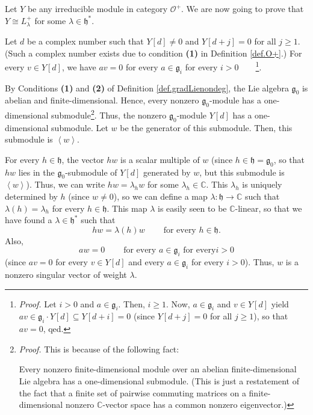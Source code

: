 \documentclass[etingof-lie.tex]{subfiles}
\begin{document}
Let $Y$ be any irreducible module in category $\mathcal{O}^{+}$. We are now
going to prove that $Y\cong L_{\lambda}^{+}$ for some $\lambda\in
\mathfrak{h}^{\ast}$.

Let $d$ be a complex number such that $Y\left[  d\right]  \neq0$ and $Y\left[
d+j\right]  =0$ for all $j\geq1$. (Such a complex number exists due to
condition \textbf{(1)} in Definition \ref{def.O+}.) For every $v\in Y\left[
d\right]  $, we have $av=0$ for every $a\in\mathfrak{g}_{i}$ for every
$i>0$\ \ \ \ \footnote{\textit{Proof.} Let $i>0$ and $a\in\mathfrak{g}_{i}$.
Then, $i\geq1$. Now, $a\in\mathfrak{g}_{i}$ and $v\in Y\left[  d\right]  $
yield $av\in\mathfrak{g}_{i}\cdot Y\left[  d\right]  \subseteq Y\left[
d+i\right]  =0$ (since $Y\left[  d+j\right]  =0$ for all $j\geq1$), so that
$av=0$, qed.}.

By Conditions \textbf{(1)} and \textbf{(2)} of Definition
\ref{def.gradLienondeg}, the Lie algebra $\mathfrak{g}_{0}$ is abelian and
finite-dimensional. Hence, every nonzero $\mathfrak{g}_{0}$-module has a
one-dimensional submodule\footnote{\textit{Proof.} This is because of the
following fact:
\par
Every nonzero finite-dimensional module over an abelian finite-dimensional Lie
algebra has a one-dimensional submodule. (This is just a restatement of the
fact that a finite set of pairwise commuting matrices on a finite-dimensional
nonzero $\mathbb{C}$-vector space has a common nonzero eigenvector.)}. Thus,
the nonzero $\mathfrak{g}_{0}$-module $Y\left[  d\right]  $ has a
one-dimensional submodule. Let $w$ be the generator of this submodule. Then,
this submodule is $\left\langle w\right\rangle $.

For every $h\in\mathfrak{h}$, the vector $hw$ is a scalar multiple of $w$
(since $h\in\mathfrak{h}=\mathfrak{g}_{0}$, so that $hw$ lies in the
$\mathfrak{g}_{0}$-submodule of $Y\left[  d\right]  $ generated by $w$, but
this submodule is $\left\langle w\right\rangle $). Thus, we can write
$hw=\lambda_{h}w$ for some $\lambda_{h}\in\mathbb{C}$. This $\lambda_{h}$ is
uniquely determined by $h$ (since $w\neq0$), so we can define a map
$\lambda:\mathfrak{h}\rightarrow\mathbb{C}$ such that $\lambda\left(
h\right)  =\lambda_{h}$ for every $h\in\mathfrak{h}$. This map $\lambda$ is
easily seen to be $\mathbb{C}$-linear, so that we have found a $\lambda
\in\mathfrak{h}^{\ast}$ such that%
\[
hw=\lambda\left(  h\right)  w\ \ \ \ \ \ \ \ \ \ \text{for every }%
h\in\mathfrak{h}.
\]
Also,%
\[
aw=0\ \ \ \ \ \ \ \ \ \ \text{for every }a\in\mathfrak{g}_{i}\text{ for every
}i>0
\]
(since $av=0$ for every $v\in Y\left[  d\right]  $ and every $a\in
\mathfrak{g}_{i}$ for every $i>0$). Thus, $w$ is a nonzero singular vector of
weight $\lambda$.
\end{document}

